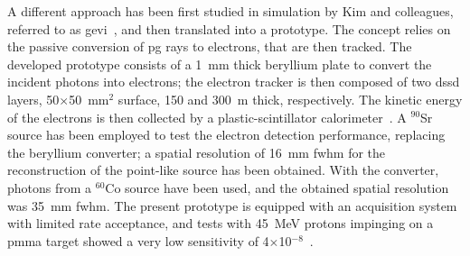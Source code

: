 A different approach has been first studied in simulation by Kim and colleagues, referred to as \gls{gevi}~\parencite{Kim2012, Kim2012ERR}, and then translated into a prototype. The concept relies on the passive conversion of \gls{pg} rays to electrons, that are then tracked. The developed prototype consists of a 1~mm thick beryllium plate to convert the incident photons into electrons; the electron tracker is then composed of two \gls{dssd} layers, 50$\times$50~mm$^2$ surface, 150 and 300~\charmu m thick, respectively. The kinetic energy of the electrons is then collected by a plastic-scintillator calorimeter~\parencite{Lee2017}. A $^{90}$Sr source has been employed to test the electron detection performance, replacing the beryllium converter; a spatial resolution of 16~mm \gls{fwhm} for the reconstruction of the point-like source has been obtained. With the converter, photons from a $^{60}$Co source have been used, and the obtained spatial resolution was 35~mm \gls{fwhm}. The present prototype is equipped with an acquisition system with limited rate acceptance, and tests with 45~MeV protons impinging on a \gls{pmma} target showed a very low sensitivity of 4$\times$10$^{-8}$~\parencite{Lee2017}.   

